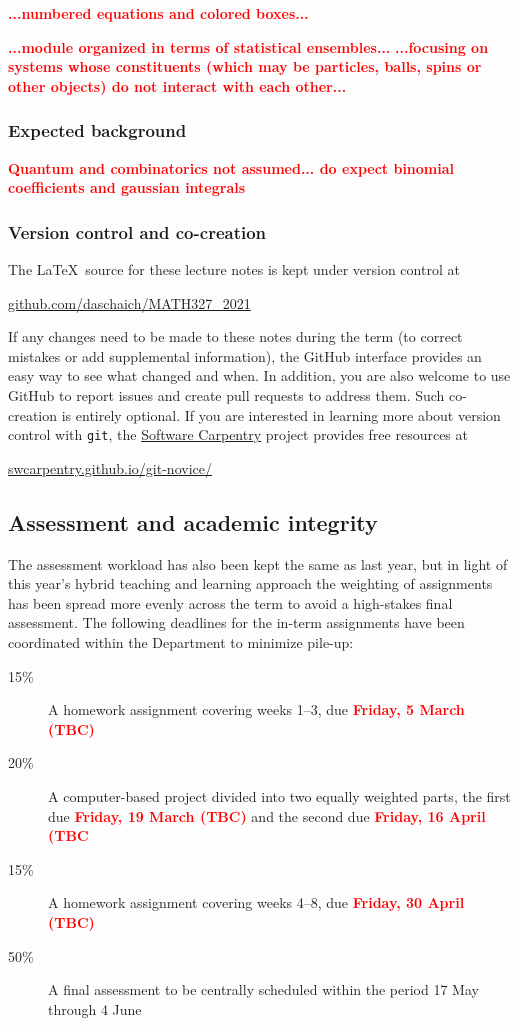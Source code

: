 \documentclass[12 pt]{article}
\newcommand{\TODO}[1]{\textcolor{red}{\textbf{#1}}}
\begin{document}
\TODO{...numbered equations and colored boxes...}

\TODO{...module organized in terms of statistical ensembles...}
\TODO{...focusing on systems whose constituents (which may be particles, balls, spins or other objects) do not interact with each other...}

\subsubsection*{Expected background}
\TODO{Quantum and combinatorics not assumed... do expect binomial coefficients and gaussian integrals}

\subsubsection*{Version control and co-creation}
The \LaTeX\ source for these lecture notes is kept under version control at \\
\centerline{\href{https://github.com/daschaich/MATH327_2021}{github.com/daschaich/MATH327\_2021}}
If any changes need to be made to these notes during the term (to correct mistakes or add supplemental information), the GitHub interface provides an easy way to see what changed and when.
In addition, you are also welcome to use GitHub to report issues and create pull requests to address them.
Such co-creation is entirely optional.
If you are interested in learning more about version control with \texttt{git}, the \href{https://software-carpentry.org}{Software Carpentry} project provides free resources at \\
\centerline{\href{https://swcarpentry.github.io/git-novice/}{swcarpentry.github.io/git-novice/}}



\subsection*{Assessment and academic integrity}
The assessment workload has also been kept the same as last year, but in light of this year's hybrid teaching and learning approach the weighting of assignments has been spread more evenly across the term to avoid a high-stakes final assessment.
The following deadlines for the in-term assignments have been coordinated within the Department to minimize pile-up: \\[-24 pt]
\begin{description}
  \item[15\%] A homework assignment covering weeks 1--3, due \TODO{Friday, 5 March (TBC)}
  \item[20\%] A computer-based project divided into two equally weighted parts, the first due \TODO{Friday, 19 March (TBC)} and the second due \TODO{Friday, 16 April (TBC}
  \item[15\%] A homework assignment covering weeks 4--8, due \TODO{Friday, 30 April (TBC)}
  \item[50\%] A final assessment to be centrally scheduled within the period 17 May through 4 June
\end{description}
\end{document}
